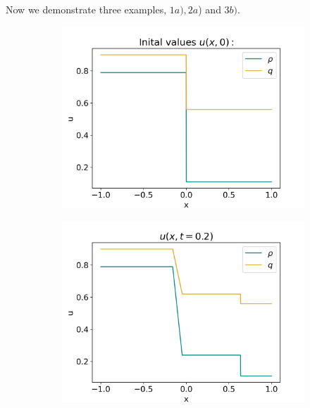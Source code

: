\documentclass[10pt]{article}
\numberwithin{equation}{section}
\begin{document}
Now we demonstrate three examples, $1a), 2a$) and $3b)$. 
\begin{figure}[H]
     \centering
     \begin{subfigure}[t]{0.35\textwidth}
         \centering
         \includegraphics[width=\textwidth]{Figures/Model/Sys1aIV.png}
     \end{subfigure}
     \begin{subfigure}[t]{0.35\textwidth}
         \centering
         \includegraphics[width=\textwidth]{Figures/Model/Sys1aAtTime.png}
     \end{subfigure}
     \hfill
     \begin{subfigure}[b]{0.35\textwidth}
         \centering

\end{subfigure}
\end{figure}
\end{document}
